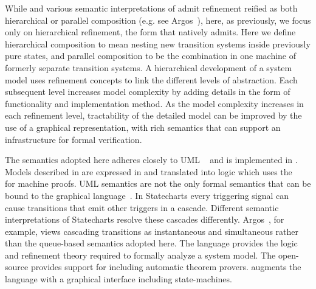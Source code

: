 While \Statecharts and various semantic interpretations of
\Statecharts admit refinement reified as both hierarchical or parallel
composition (e.g. see Argos~\cite{Maraninchi91theargos}), here, as
previously\cite{snook14:_b_statem}, we focus only on hierarchical
refinement, the form that \EventB natively admits.  Here we define
hierarchical composition to mean nesting new transition systems inside
previously pure states, and parallel composition to be the combination
in one machine of formerly separate transition systems.
  A hierarchical development of a system model uses refinement
concepts to link the different levels of abstraction. Each subsequent
level increases model complexity by adding details in the form of
functionality and implementation method. As the model complexity
increases in each refinement level, tractability of the detailed model
can be improved by the use of a graphical representation, with rich
semantics that can support an infrastructure for formal verification.


The semantics adopted here adheres closely to UML \Statecharts~\cite{Alexandre} and is implemented in \iUMLB.
 Models described in \Statecharts are expressed in \SCXML and
 translated into \EventB logic which uses the \Rodin~\cite{Abrial} for
 machine proofs.  UML \Statechart semantics are not the only formal
 semantics that can be bound to the \Statechart graphical
 language~\cite{Eshuis_2009}.  In Statecharts every triggering signal
 can cause transitions that emit other triggers in a cascade.
 Different semantic interpretations of Statecharts resolve these
 cascades differently.  Argos~\cite{Maraninchi91theargos}, for
 example, views cascading transitions as instantaneous and
 simultaneous rather than the queue-based semantics adopted here.
%
The \EventB language
\cite{abrial10:_model_event_b} provides the logic and refinement
theory required to formally analyze a system model.  The open-source
\Rodin \cite{abrial10:_rodin} provides support for \EventB
including automatic theorem provers.  \iUMLB
augments the \EventB language with a graphical interface including
state-machines.  

